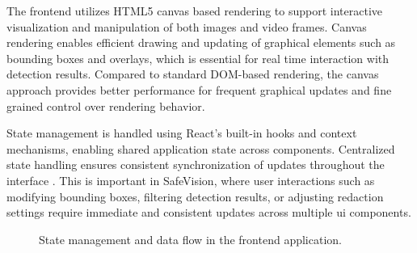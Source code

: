 
The frontend utilizes HTML5 canvas based rendering to support interactive visualization and manipulation of both images and video frames. Canvas rendering enables efficient drawing and updating of graphical elements such as \gls{bounding box}es and overlays, which is essential for real time interaction with detection results. Compared to standard DOM-based rendering, the canvas approach provides better performance for frequent graphical updates and fine grained control over rendering behavior.


State management is handled using React’s built-in hooks and context mechanisms, enabling shared application state across components. Centralized state handling ensures consistent synchronization of updates throughout the interface \cite{react_state_management}. This is important in \gls{SafeVision}, where user interactions such as modifying \gls{bounding box}es, filtering detection results, or adjusting redaction settings require immediate and consistent updates across multiple \acrshort{ui} components.

\begin{figure}[htbp]
\centering
{}

\caption{State management and data flow in the frontend application.}
\label{fig:state-management-flow}

\end{figure}

